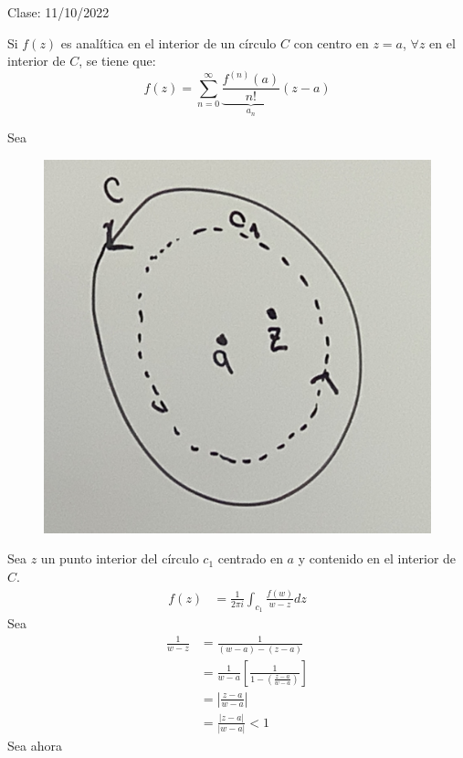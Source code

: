 Clase: 11/10/2022


\begin{teorema}[Taylor]
    Si $f(z)$ es analítica en el interior de un círculo $C$ con centro en $z=a$, $\forall z$ en el interior de $C$, se tiene que: 
    $$f(z)= \sum_{n=0}^\infty \underbrace{\frac{f^{(n)}(a)}{n!}}_{a_n}(z-a)$$
    \begin{dem}
        Sea 
        \begin{figure}[H]
           \centering
           \includegraphics[scale=0.1]{imagenes/21.1.jpeg} 
        \end{figure}
        Sea $z$ un punto interior del círculo $c_1$ centrado en $a$ y contenido en el interior de $C$. 
        \begin{align*}
            f(z)&=\frac{1}{2\pi i}\int_{c_1}\frac{f(w)}{w-z}dz
        \end{align*}
        Sea 
        \begin{align*}
            \frac{1}{w-z}&=\frac{1}{(w-a)-(z-a)}\\
            &=\frac{1}{w-a}\left[\frac{1}{1-\left(\frac{z-a}{w-a}\right)}\right]\\
            &= \left|\frac{z-a}{w-a} \right|\\
            &= \frac{|z-a|}{|w-a|}<1
        \end{align*}
        Sea ahora
        \begin{align*}

\end{align*}
\end{dem}
\end{teorema}
